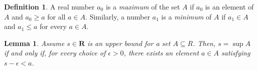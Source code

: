 \documentclass{amsart}
\newtheorem*{lemma}{Lemma}
\theoremstyle{definition}
\newtheorem*{definition}{Definition}
\newcommand{\R}{\mathbf{R}}
\begin{document}
\begin{definition}
  A real number $a_0$ is a \emph{maximum} of the set $A$ if $a_0$ is an element
  of $A$ and $a_0 \ge a$ for all $a \in A$. Similarly, a number $a_1$ is a
  \emph{minimum} of $A$ if $a_1 \in A$ and $a_1 \le a$ for every $a \in A$.
\end{definition}

\begin{lemma}
  Assume $s \in \R$ is an upper bound for a set $A \subseteq R$. Then, $s =
  \sup{A}$ if and only if, for every choice of $\epsilon > 0$, there exists an
  element $a \in A$ satisfying $s - \epsilon < a$.
\end{lemma}
\end{document}
